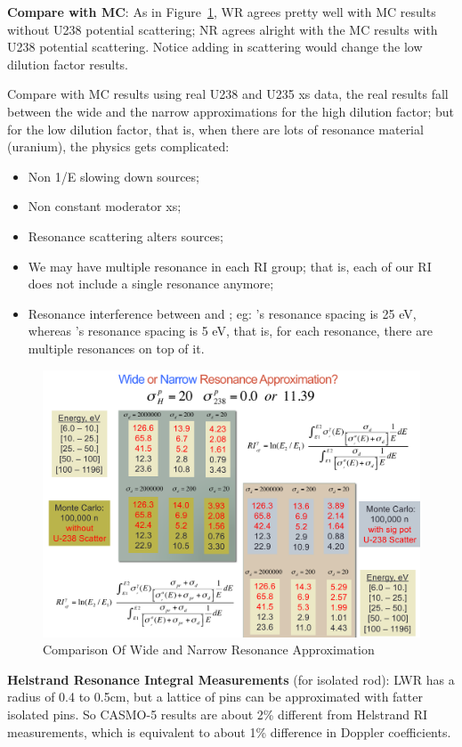 \documentclass{school-22.211-notes}
\begin{document}
\textbf{Compare with MC}\label{narrow-wide-compr}: As in Figure~\ref{wide-vs-narrow}, WR agrees pretty well with MC results without U238 potential scattering; NR agrees alright with the MC results with U238 potential scattering. Notice adding in scattering would change the low dilution factor results.

Compare with MC results using real U238 and U235 xs data, the real results fall between the wide and the narrow approximations for the high dilution factor; but for the low dilution factor, that is, when there are lots of resonance material (uranium), the physics gets complicated: 
\begin{itemize}
\item Non 1/E slowing down sources;
\item Non constant moderator xs;
\item Resonance scattering alters sources;
\item We may have multiple resonance in each RI group; that is, each of our RI does not include a single resonance anymore;
\item Resonance interference between  and ; eg: 's resonance spacing is 25 eV, whereas 's resonance spacing is 5 eV, that is, for each  resonance, there are multiple  resonances on top of it. 
\end{itemize}
\begin{figure}
  \centering
  \includegraphics[width=5in]{images/r-m/narrow-vs-wide-resonance.png}
  \caption{Comparison Of Wide and Narrow Resonance Approximation} \label{wide-vs-narrow}
\end{figure}
\textbf{Helstrand Resonance Integral Measurements} (for isolated rod): LWR has a radius of 0.4 to 0.5cm, but a lattice of pins can be approximated with fatter isolated pins. So CASMO-5 results are about 2\% different from Helstrand RI measurements, which is equivalent to about 1\% difference in Doppler coefficients. 
\end{document}
